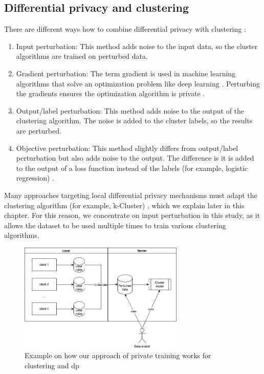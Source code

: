 \subsection{Differential privacy and clustering} \label{theory:literature-review:dp-clustering}
There are different ways how to combine differential privacy with clustering \citep{baraheem_survey_2022}:
\begin{enumerate}
  \item Input perturbation: This method adds noise to the input data, so the cluster algorithms are trained on perturbed data.
  \item Gradient perturbation: The term gradient is used in machine learning algorithms that solve an optimization problem like deep learning \citep{hassan_differential_2019}.
        Perturbing the gradients ensures the optimization algorithm is private \citep{ji_differential_2014}.
  \item Output/label perturbation: This method adds noise to the output of the clustering algorithm.
        The noise is added to the cluster labels, so the results are perturbed.
  \item Objective perturbation: This method slightly differs from output/label perturbation but also adds noise to the output.
        The difference is it is added to the output of a loss function instead of the labels (for example, logistic regression) \citep{baraheem_survey_2022}.
\end{enumerate}
Many approaches targeting local differential privacy mechanisms must adapt the clustering algorithm (for example, k-Cluster) \citep{sun_distributed_2019}, which we explain later in this chapter.
For this reason, we concentrate on input perturbation in this study, as it allows the dataset to be used multiple times to train various clustering algorithms.
\begin{figure}[H]
  \includegraphics[width=0.7\textwidth]{./TheorethicalFramework/ND-Laplace/Images/overview-clustering&dp.png}
  \caption{Example on how our approach of private training works for clustering and \gls{dp}}
  \label{fig:overview-clustering-and-dp}
\end{figure}
